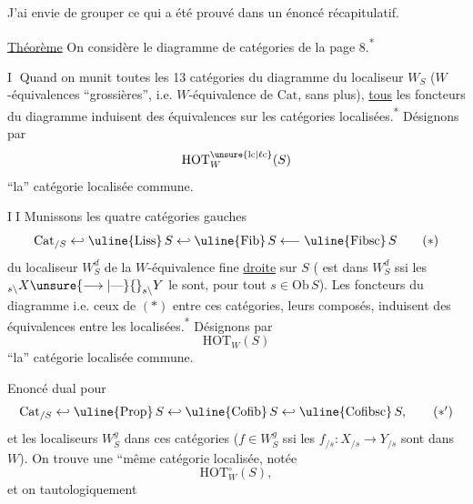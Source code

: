 J'ai envie de grouper ce qui a été prouvé dans un énoncé récapitulatif.

\uline{Théorème} \quad On considère le diagramme de catégories de la page 8.\textsuperscript{*}

\textcircled{I} Quand on munit toutes les 13 catégories du diagramme du localiseur $W_S$ ($W$-équivalences ``grossières'', i.e. $W$-équivalence de $\mathrm{Cat}$, sans plus), \uline{tous} les foncteurs du diagramme induisent des équivalences sur les catégories localisées.\textsuperscript{*}
Désignons par
\[
 \mathrm{HOT}^{\unsure{\mathrm{lc}|\ell\mathrm{c}}}_W(S)
\]
``la'' catégorie localisée commune.

\textcircled{II} Munissons les quatre catégories  gauches
\[
 \mathrm{Cat}_{/S}\hookleftarrow\text{\uline{Liss}}\,S\hookleftarrow\text{\uline{Fib}}\,S\longleftarrow\text{\uline{Fibsc}}\,S
 \tag*{$(*)$}
\]
du localiseur $W_S^d$ de la $W$-équivalence fine \uline{droite} sur $S$ (
est dans $W_S^d$ ssi les ${}_{s\backslash}X\unsure{\longrightarrow|\text{---}}{}_{s\backslash}Y$ le sont, pour tout $s\in\mathrm{Ob}\,S$). Les foncteurs du diagramme i.e. ceux de $(*)$ entre ces catégories,   leurs composés, induisent des équivalences entre les localisées.\textsuperscript{*}
Désignons par
\[
 \mathrm{HOT}_W(S)
\]
``la'' catégorie localisée commune.

Enoncé dual pour
\[
 \mathrm{Cat}_{/S}\hookleftarrow\text{\uline{Prop}}\,S\hookleftarrow\text{\uline{Cofib}}\,S\hookleftarrow\text{\uline{Cofibsc}}\,S,
 \tag*{$(*')$}
\]
et les localiseurs $W_S^g$ dans ces catégories ($f\in W_S^g$ ssi les $f_{/s}:X_{/s}\longrightarrow Y_{/s}$ sont dans $W$). On trouve une ``même catégorie localisée, notée
\[
 \mathrm{HOT}_W^\circ(S),
\]
et on   tautologiquement
